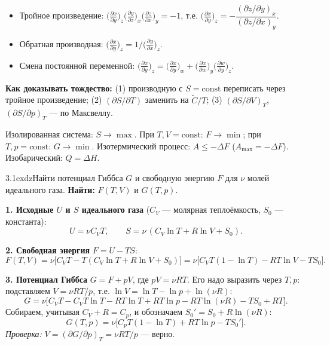 \begin{basics}
\begin{itemize}
\item Тройное произведение: $\big(\frac{\partial x}{\partial y}\big)_z\big(\frac{\partial y}{\partial z}\big)_x\big(\frac{\partial z}{\partial x}\big)_y=-1$, т.е.
$\big(\frac{\partial x}{\partial y}\big)_z=-\dfrac{(\partial z/\partial y)_x}{(\partial z/\partial x)_y}$.
\item Обратная производная: $\big(\frac{\partial x}{\partial y}\big)_z=1\big/\big(\frac{\partial y}{\partial x}\big)_z$.
\item Смена постоянной переменной: $\big(\frac{\partial x}{\partial y}\big)_z=\big(\frac{\partial x}{\partial y}\big)_w+\big(\frac{\partial x}{\partial w}\big)_y\big(\frac{\partial w}{\partial y}\big)_z$.
\end{itemize}
\textbf{Как доказывать тождество:} (1) производную с $S=\mathrm{const}$ переписать через тройное произведение;
(2) $(\partial S/\partial T)$ заменить на $\widetilde C/T$; (3) $(\partial S/\partial V)_T$, $(\partial S/\partial p)_T$ — по Максвеллу.

Изолированная система: $S\to\max$. При $T,V=\mathrm{const}$: $F\to\min$; при $T,p=\mathrm{const}$: $G\to\min$.
Изотермический процесс: $A\le-\Delta F$ ($A_{\max}=-\Delta F$). Изобарический: $Q=\Delta H$.
\end{basics}

\begin{problem}{3.1}{exdz}{Найти потенциал Гиббса $G$ и свободную энергию $F$ для $\nu$ молей идеального газа.}
\textbf{Найти:} $F(T,V)$ и $G(T,p)$.

\textbf{1. Исходные $U$ и $S$ идеального газа} ($C_V$ — молярная теплоёмкость, $S_0$ — константа):
\[U=\nu C_VT,\qquad S=\nu\,(C_V\ln T+R\ln V+S_0).\]

\textbf{2. Свободная энергия} $F=U-TS$:
\[F(T,V)=\nu\big[C_VT-T(C_V\ln T+R\ln V+S_0)\big]=\nu\big[C_VT(1-\ln T)-RT\ln V-TS_0\big].\]

\textbf{3. Потенциал Гиббса} $G=F+pV$, где $pV=\nu RT$. Его надо выразить через $T,p$: подставляем $V=\nu RT/p$, т.е.
$\ln V=\ln T-\ln p+\ln(\nu R)$:
\[G=\nu\big[C_VT-C_VT\ln T-RT\ln T+RT\ln p-RT\ln(\nu R)-TS_0+RT\big].\]
Собираем, учитывая $C_V+R=C_p$, и обозначаем $S_0'=S_0+R\ln(\nu R)$:
\[G(T,p)=\nu\big[C_pT(1-\ln T)+RT\ln p-TS_0'\big].\]
\textit{Проверка:} $V=(\partial G/\partial p)_T=\nu RT/p$ — верно.
\end{problem}

